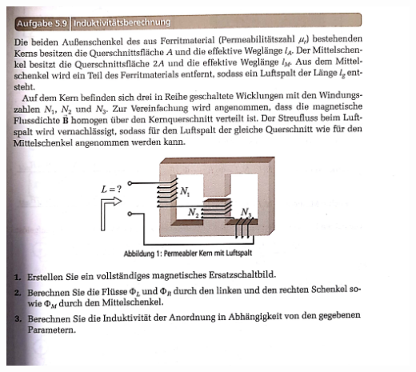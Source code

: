 \documentclass[a4paper, 8pt, landscape]{scrartcl} %
\begin{document}
\begin{multicols}{2}
    \vfill \null \columnbreak

    \includegraphics[width=\columnwidth]{img/zusatz_h-2.jpg} \\

      \vfill \null \columnbreak




\end{multicols}
\end{document}
